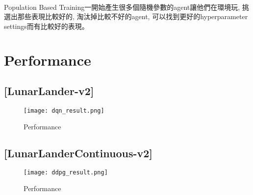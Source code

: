 \paragraph{}
Population Based Training一開始產生很多個隨機參數的agent讓他們在環境玩, 挑選出那些表現比較好的, 淘汰掉比較不好的agent, 可以找到更好的hyperparameter settings而有比較好的表現。
\newpage
\section{Performance}
\subsection{[LunarLander-v2]}
\begin{figure}[!ht]
    \begin{center}
        \texttt{[image: dqn\_result.png]}
        \caption{Performance}
    \end{center}
\end{figure}
\subsection{[LunarLanderContinuous-v2]}
\begin{figure}[!ht]
    \begin{center}
        \texttt{[image: ddpg\_result.png]}
        \caption{Performance}
    \end{center}
\end{figure}
